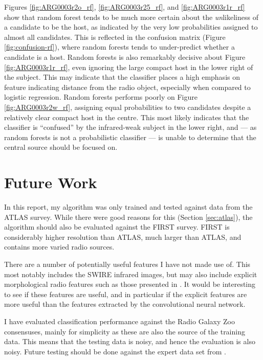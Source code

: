 \documentclass[a4paper]{article}
\newcommand{\fig}{Figure }
\newcommand{\sect}{Section }
\begin{document}

    Figures \ref{fig:ARG0003r2o_rf}, \ref{fig:ARG0003r25_rf}, and \ref{fig:ARG0003r1r_rf} show that random forest tends to be much more certain about the \emph{un}likeliness of a candidate to be the host, as indicated by the very low probabilities assigned to almost all candidates. This is reflected in the confusion matrix (\fig \ref{fig:confusion-rf}), where random forests tends to under-predict whether a candidate is a host. Random forests is also remarkably decisive about \fig \ref{fig:ARG0003r1r_rf}, even ignoring the large compact host in the lower right of the subject. This may indicate that the classifier places a high emphasis on feature indicating distance from the radio object, especially when compared to logistic regression. Random forests performs poorly on \fig \ref{fig:ARG0003r2w_rf}, assigning equal probabilities to two candidates despite a relatively clear compact host in the centre. This most likely indicates that the classifier is ``confused'' by the infrared-weak subject in the lower right, and --- as random forests is not a probabilistic classifier --- is unable to determine that the central source should be focused on.

  \section{Future Work}

    In this report, my algorithm was only trained and tested against data from the ATLAS survey. While there were good reasons for this (\sect \ref{sec:atlas}), the algorithm should also be evaluated against the FIRST survey. FIRST is considerably higher resolution than ATLAS\cite{norris06,becker95}, much larger than ATLAS, and contains more varied radio sources.

    There are a number of potentially useful features I have not made use of. This most notably includes the SWIRE infrared images, but may also include explicit morphological radio features such as those presented in \citet{proctor06}. It would be interesting to see if these features are useful, and in particular if the explicit features are more useful than the features extracted by the convolutional neural network.

    I have evaluated classification performance against the Radio Galaxy Zoo consensuses, mainly for simplicity as these are also the source of the training data. This means that the testing data is noisy, and hence the evaluation is also noisy. Future testing should be done against the expert data set from \citet{norris06}.
\end{document}
